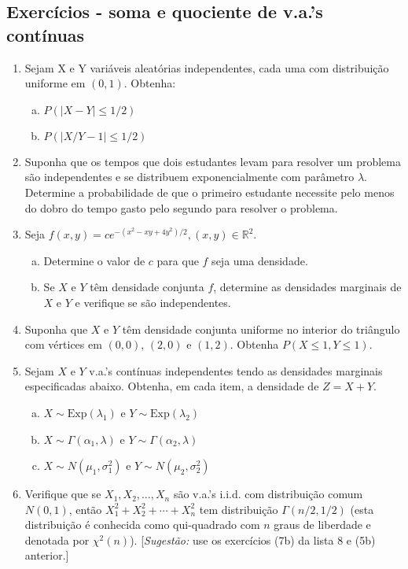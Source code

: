\documentclass[../Notas.tex]{subfiles}
\begin{document}
\subsection{Exercícios - soma e quociente de v.a.'s contínuas}

\begin{enumerate}
    \item Sejam X e Y variáveis aleatórias independentes, cada uma com distribuição uniforme em $(0,1)$. Obtenha:
    \begin{enumerate}[a)]
    \item $P(|X - Y| \leq 1/2)$
    \item $P(|X/Y - 1 | \leq 1/2)$
    \end{enumerate}
    \item Suponha que os tempos que dois estudantes levam para resolver um problema são independentes e se distribuem exponencialmente com parâmetro $\lambda$. Determine a probabilidade de que o primeiro estudante necessite pelo menos do dobro do tempo gasto pelo segundo para resolver o problema.
    \item Seja $f(x, y) = ce^{-(x^2-xy+4y^2)/2 }, (x, y) \in\mathbb{R}^2$.
    \begin{enumerate}[a)]
    \item Determine o valor de $c$ para que $f$ seja uma densidade.
    \item Se $X$ e $Y$ têm densidade conjunta $f$, determine as densidades marginais de $X$ e $Y$ e verifique se são independentes.
    \end{enumerate}
    \item Suponha que $X$ e $Y$ têm densidade conjunta uniforme no interior do triângulo com vértices em $(0,0)$, $(2,0)$ e $(1,2)$. Obtenha $P(X \leq 1, Y \leq 1)$.
    \item Sejam $X$ e $Y$ v.a.’s contínuas independentes tendo as densidades marginais especificadas abaixo. Obtenha, em cada item, a densidade de $Z = X + Y$.
    \begin{enumerate}[a)]
    \item $X\sim\text{Exp}(\lambda_1)$ e $Y\sim\text{Exp}(\lambda_2)$
    \item $X\sim\Gamma(\alpha_1,\lambda)$ e $Y\sim\Gamma(\alpha_2, \lambda)$
    \item $X\sim N(\mu_1, \sigma_1^2)$ e $Y\sim N(\mu_2, \sigma_2^2)$
    \end{enumerate}
    \item Verifique que se $X_1, X_2,\dots, X_n$ são v.a.’s i.i.d. com distribuição comum $N(0,1)$, então $X_1^2 + X_2^2 + \cdots + X_n^2$ tem distribuição $\Gamma(n/2, 1/2)$ (esta distribuição é conhecida como qui-quadrado com $n$ graus de liberdade e denotada por $\chi^2(n)$). [\textit{Sugestão:} use os exercícios (7b) da lista 8 e (5b) anterior.]

\end{enumerate}
\end{document}
